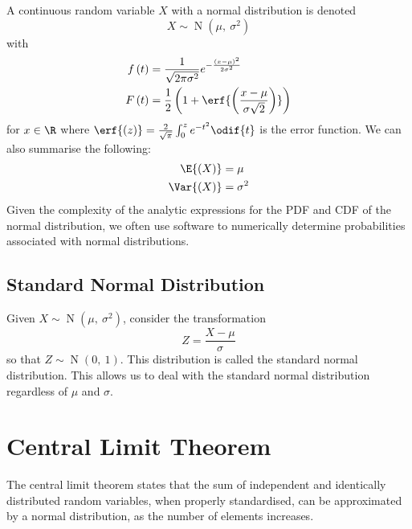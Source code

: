 \documentclass{article}
\begin{document}
\begin{multicols}{3}
    A continuous random variable \(X\) with a normal distribution is denoted
    \begin{equation*}
        X \sim \operatorname{N}{\left( \mu,\: \sigma^2 \right)}
    \end{equation*}
    with
    \begin{align*}
        f\left( t \right) & = \frac{1}{\sqrt{2 \pi \sigma^2}} e^{-\frac{\left( x - \mu \right)^2}{2 \sigma^2}}    \\
        F\left( t \right) & = \frac{1}{2} \left( 1 + \erf{\left( \frac{x - \mu}{\sigma \sqrt{2}} \right)} \right)
    \end{align*}
    for \(x \in \R\) where \(\erf{\left( z \right)} = \frac{2}{\sqrt{\pi}} \int_0^z e^{-t^2} \odif{t}\) is the error function.
    We can also summarise the following:
    \begin{align*}
        \E{\left( X \right)}   & = \mu      \\
        \Var{\left( X \right)} & = \sigma^2
    \end{align*}
    Given the complexity of the analytic expressions for the PDF and CDF of the normal distribution, we often
    use software to numerically determine probabilities associated with normal distributions.
    \subsection{Standard Normal Distribution}
    Given \(X \sim \operatorname{N}{\left( \mu,\: \sigma^2 \right)}\), consider the transformation
    \begin{equation*}
        Z = \frac{X - \mu}{\sigma}
    \end{equation*}
    so that \(Z \sim \operatorname{N}{\left( 0,\: 1 \right)}\). This distribution is called the standard normal distribution.
    This allows us to deal with the standard normal distribution regardless of \(\mu\) and \(\sigma\).
    \section{Central Limit Theorem}
    The central limit theorem states that the sum of independent and identically distributed random variables, when properly standardised,
    can be approximated by a normal distribution, as the number of elements increases.

\end{multicols}
\end{document}
